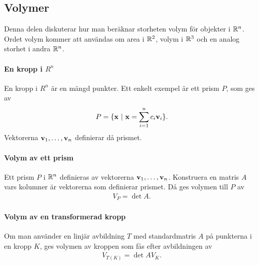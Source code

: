 \subsection{Volymer}
Denna delen diskuterar hur man beräknar storheten volym för objekter i $\mathbb{R}^n$. Ordet volym kommer att användas om area i $\mathbb{R}^2$, volym i $\mathbb{R}^3$ och en analog storhet i andra $\mathbb{R}^n$.

\paragraph{En kropp i $R^n$}
En kropp i $R^n$ är en mängd punkter. Ett enkelt exempel är ett prism $P$, som ges av
\begin{align*}
	P = \{\vect{x}~|~\vect{x} = \sum_{i = 1}^{n}c_i\vect{v}_i\}.
\end{align*}
Vektorerna $\vect{v}_1, \dots, \vect{v}_n$ definierar då prismet.

\paragraph{Volym av ett prism}
Ett prism $P$ i $\mathbb{R}^n$ definieras av vektorerna $\vect{v}_1, \dots, \vect{v}_n$. Konstruera en matris $A$ vars kolumner är vektorerna som definierar prismet. Då ges volymen till $P$ av
\begin{align*}
	V_P = \det{A}.
\end{align*}

\paragraph{Volym av en transformerad kropp}
Om man använder en linjär avbildning $T$ med standardmatris $A$ på punkterna i en kropp $K$, ges volymen av kroppen som fås efter avbildningen av
\begin{align*}
	V_{T(K)} = \det{A} V_K.
\end{align*}